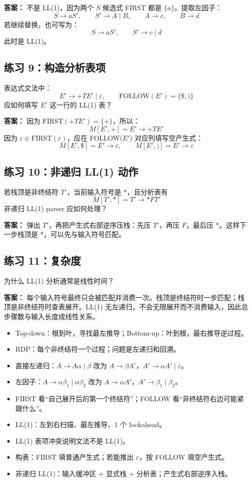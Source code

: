 \documentclass[UTF8,fontset=none,11pt]{ctexart}
\newenvironment{notebox}[1][]{%
  \par\medskip\noindent{\color{maincol}\rule{\linewidth}{1.1pt}}\par\nopagebreak
  \noindent{\bfseries\color{maincol}#1}\par\nopagebreak\smallskip}%
  {\par\nopagebreak\smallskip\noindent{\color{maincol}\rule{\linewidth}{0.4pt}}\par\medskip}
\newcommand{\eps}{\varepsilon}
\begin{document}
\textbf{答案：}
不是 LL(1)，因为两个 \(S\) 候选式 FIRST 都是 \(\{a\}\)。提取左因子：
\[
S\to aS',\qquad S'\to A\mid B,\qquad A\to c,\qquad B\to d
\]
若继续替换，也可写为：
\[
S\to aS',\qquad S'\to c\mid d
\]
此时是 LL(1)。

\subsection*{练习 9：构造分析表项}
表达式文法中：
\[
E'\to +TE'\mid\eps,\qquad \mathrm{FOLLOW}(E')=\{\$,)\}
\]
应如何填写 \(E'\) 这一行的 LL(1) 表？

\textbf{答案：}
因为 \(\mathrm{FIRST}(+TE')=\{+\}\)，所以：
\[
M[E',+]=E'\to +TE'
\]
因为 \(\eps\in\mathrm{FIRST}(\eps)\)，应在 FOLLOW(\(E'\)) 对应列填写空产生式：
\[
M[E',\$]=E'\to\eps,\qquad M[E',)]=E'\to\eps
\]

\subsection*{练习 10：非递归 LL(1) 动作}
若栈顶是非终结符 \(T'\)，当前输入符号是 \(*\)，且分析表有
\[
M[T',*]=T'\to *FT'
\]
非递归 LL(1) parser 应如何处理？

\textbf{答案：}
弹出 \(T'\)，再把产生式右部逆序压栈：先压 \(T'\)，再压 \(F\)，最后压 \(*\)。这样下一步栈顶是 \(*\)，可以先与输入符号匹配。

\subsection*{练习 11：复杂度}
为什么 LL(1) 分析通常是线性时间？

\textbf{答案：}
每个输入符号最终只会被匹配并消费一次。栈顶是终结符时一步匹配；栈顶是非终结符时查表展开。LL(1) 无左递归，不会无限展开而不消费输入，因此总步骤数与输入长度成线性关系。

\begin{notebox}[考前速记]
\begin{itemize}
  \item Top-down：根到叶，寻找最左推导；Bottom-up：叶到根，最右推导逆过程。
  \item RDP：每个非终结符一个过程；问题是左递归和回溯。
  \item 直接左递归：\(A\to A\alpha\mid\beta\) 改为 \(A\to\beta A'\)，\(A'\to\alpha A'\mid\eps\)。
  \item 左因子：\(A\to\alpha\beta_1\mid\alpha\beta_2\) 改为 \(A\to\alpha A'\)，\(A'\to\beta_1\mid\beta_2\)。
  \item FIRST 看“自己展开后的第一个终结符”；FOLLOW 看“非终结符右边可能紧跟什么”。
  \item LL(1)：左到右扫描、最左推导、1 个 lookahead。
  \item LL(1) 表项冲突说明文法不是 LL(1)。
  \item 构表：FIRST 填普通产生式；若能推出 \(\eps\)，按 FOLLOW 填空产生式。
  \item 非递归 LL(1)：输入缓冲区 + 显式栈 + 分析表；产生式右部逆序入栈。
\end{itemize}
\end{notebox}
\end{document}
